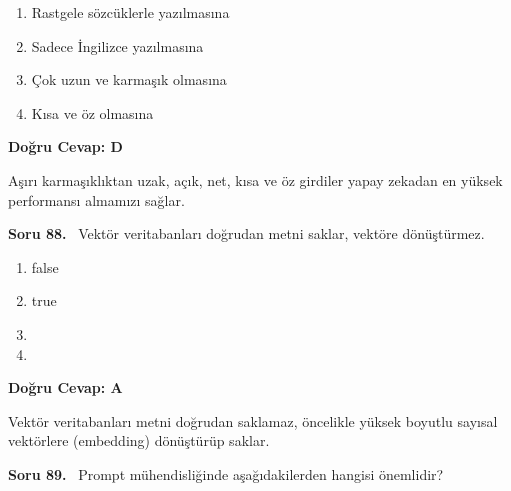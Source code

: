 \documentclass[11pt,a4paper,openany]{book}
\begin{document}
\begin{enumerate}[label=\Alph*), leftmargin=25pt, topsep=4pt, itemsep=2pt]
        \item Rastgele sözcüklerle yazılmasına
        \item Sadece İngilizce yazılmasına
        \item Çok uzun ve karmaşık olmasına
        \item Kısa ve öz olmasına
\end{enumerate}

\vspace{4pt}
\begin{tcolorbox}[title=Cevap ve Açıklama, colback=gray!3!white, colframe=primarycolor!90!black, arc=2mm, fonttitle=\bfseries\sffamily, top=6pt, bottom=6pt]
    \textbf{Doğru Cevap: D}

    \vspace{2pt}
    Aşırı karmaşıklıktan uzak, açık, net, kısa ve öz girdiler yapay zekadan en yüksek performansı almamızı sağlar.
\end{tcolorbox}
\vspace{10pt}
\needspace{5cm}
\vspace{8pt}
\noindent\textbf{\large\sffamily Soru 88.} \ Vektör veritabanları doğrudan metni saklar, vektöre dönüştürmez.

\begin{enumerate}[label=\Alph*), leftmargin=25pt, topsep=4pt, itemsep=2pt]
        \item false
        \item true
        \item 
        \item 
\end{enumerate}

\vspace{4pt}
\begin{tcolorbox}[title=Cevap ve Açıklama, colback=gray!3!white, colframe=primarycolor!90!black, arc=2mm, fonttitle=\bfseries\sffamily, top=6pt, bottom=6pt]
    \textbf{Doğru Cevap: A}

    \vspace{2pt}
    Vektör veritabanları metni doğrudan saklamaz, öncelikle yüksek boyutlu sayısal vektörlere (embedding) dönüştürüp saklar.
\end{tcolorbox}
\vspace{10pt}
\needspace{5cm}
\vspace{8pt}
\noindent\textbf{\large\sffamily Soru 89.} \ Prompt mühendisliğinde aşağıdakilerden hangisi önemlidir?
\end{document}
